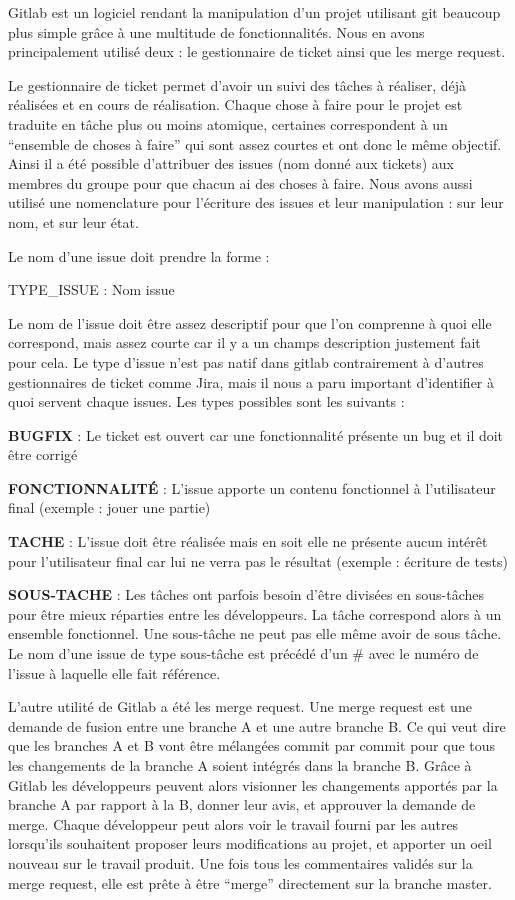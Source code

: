 \hspace{3em}
Gitlab est un logiciel rendant la manipulation d’un projet utilisant git beaucoup plus simple grâce à une multitude de fonctionnalités. Nous en avons principalement utilisé deux : le gestionnaire de ticket ainsi que les merge request.

	Le gestionnaire de ticket permet d’avoir un suivi des tâches à réaliser, déjà réalisées et en cours de réalisation. Chaque chose à faire pour le projet est traduite en tâche plus ou moins atomique, certaines correspondent à un “ensemble de choses à faire” qui sont assez courtes et ont donc le même objectif. Ainsi il a été possible d’attribuer des issues (nom donné aux tickets) aux membres du groupe pour que chacun ai des choses à faire. Nous avons aussi utilisé une nomenclature pour l’écriture des issues et leur manipulation : sur leur nom, et sur leur état.

	Le nom d’une issue doit prendre la forme :

	TYPE_ISSUE : Nom issue

Le nom de l’issue doit être assez descriptif pour que l’on comprenne à quoi elle correspond, mais assez courte car il y a un champs description justement fait pour cela.
Le type d’issue n’est pas natif dans gitlab contrairement à d’autres gestionnaires de ticket comme Jira, mais il nous a paru important d’identifier à quoi servent chaque issues.
Les types possibles sont les suivants :

\textbf{BUGFIX} : Le ticket est ouvert car une fonctionnalité présente un bug et il doit être corrigé

\textbf{FONCTIONNALITÉ} : L’issue apporte un contenu fonctionnel à l’utilisateur final (exemple : jouer une partie)

\textbf{TACHE} : L’issue doit être réalisée mais en soit elle ne présente aucun intérêt pour l’utilisateur final car lui ne verra pas le résultat (exemple : écriture de tests)

\textbf{SOUS-TACHE} : Les tâches ont parfois besoin d’être divisées en sous-tâches pour être mieux réparties entre les développeurs. La tâche correspond alors à un ensemble fonctionnel. Une sous-tâche ne peut pas elle même avoir de sous tâche. Le nom d’une issue de type sous-tâche est précédé d’un # avec le numéro de l’issue à laquelle elle fait référence.

	L’autre utilité de Gitlab a été les merge request. Une merge request est une demande de fusion entre une branche A et une autre branche B. Ce qui veut dire que les branches A et B vont être mélangées commit par commit pour que tous les changements de la branche A soient intégrés dans la branche B.
Grâce à Gitlab les développeurs peuvent alors visionner les changements apportés par la branche A par rapport à la B, donner leur avis, et approuver la demande de merge.
Chaque développeur peut alors voir le travail fourni par les autres lorsqu’ils souhaitent proposer leurs modifications au projet, et apporter un oeil nouveau sur le travail produit. Une fois tous les commentaires validés sur la merge request, elle est prête à être “merge” directement sur la branche master.

